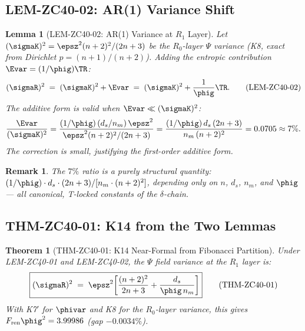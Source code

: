 \documentclass[12pt, a4paper]{article}
\newtheorem{theorem}{Theorem}[section]
\newtheorem{lemma}{Lemma}[section]
\newtheorem{remark}{Remark}[section]
\begin{document}
\subsection{LEM-ZC40-02: AR(1) Variance Shift}
\label{sec:lem2}

\begin{lemma}[LEM-ZC40-02: AR(1) Variance at $R_1$ Layer]
\label{lem:ar1}
Let $(\sigmaK)^2 = \epsz^2(n+2)^2/(2n+3)$ be the $R_0$-layer
$\Psi$ variance (K8, exact from Dirichlet $p=(n+1)/(n+2)$).
Adding the entropic contribution $\Evar = (1/\phig)\TR$:
\[
  (\sigmaR)^2 \;=\; (\sigmaK)^2 + \Evar
  \;=\; (\sigmaK)^2 + \frac{1}{\phig}\TR.
  \tag{LEM-ZC40-02}
\]
The additive form is valid when $\Evar \ll (\sigmaK)^2$:
\[
  \frac{\Evar}{(\sigmaK)^2}
  = \frac{(1/\phig)\,(d_s/n_m)\,\epsz^2}{\epsz^2(n+2)^2/(2n+3)}
  = \frac{(1/\phig)\,d_s\,(2n+3)}{n_m\,(n+2)^2}
  = 0.0705 \approx 7\%.
\]
The correction is small, justifying the first-order additive form.
\end{lemma}

\begin{remark}
The $7\%$ ratio is a purely structural quantity:
$(1/\phig)\cdot d_s\cdot(2n+3)/[n_m\cdot(n+2)^2]$,
depending only on $n$, $d_s$, $n_m$, and $\phig$ ---
all canonical, T-locked constants of the $\delta$-chain.
\end{remark}

\subsection{THM-ZC40-01: K14 from the Two Lemmas}
\label{sec:thm}

\begin{theorem}[THM-ZC40-01: K14 Near-Formal from Fibonacci Partition]
\label{thm:k14}
Under LEM-ZC40-01 and LEM-ZC40-02, the $\Psi$ field variance at the
$R_1$ layer is:
\[
  \boxed{
  (\sigmaR)^2 \;=\; \epsz^2\!\left[\frac{(n+2)^2}{2n+3}
    + \frac{d_s}{\phig\,n_m}\right]
  }
  \tag{THM-ZC40-01}
\]
With K7$'$ for $\phivar$ and K8 for the $R_0$-layer variance,
this gives $F_{\rm ren}\phig^2 = 3.99986$ (gap $-0.0034\%$).
\end{theorem}
\end{document}
